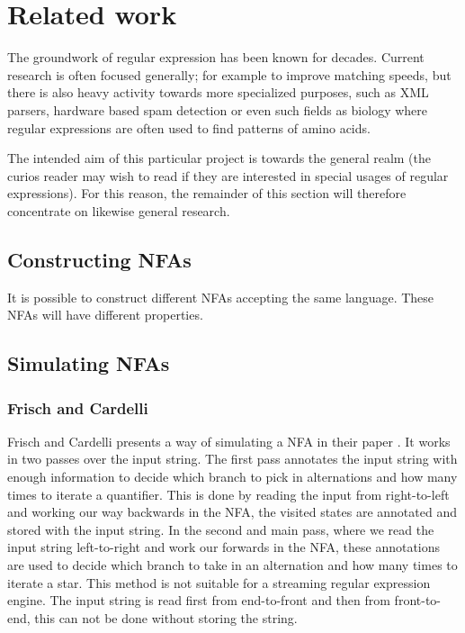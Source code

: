 \section{Related work}


The groundwork of regular expression has been known for
decades. Current research is often focused generally; for
example to improve matching speeds, but there is also heavy activity
towards more specialized purposes, such as XML parsers, hardware based spam
detection or even such fields as biology where regular expressions are
often used to find patterns of amino acids. 

The intended aim of this particular project is towards the general
realm (the curios reader may wish to read  if they
are interested in special usages of regular expressions). For this
reason, the remainder of this section will therefore concentrate on
likewise general research.



\subsection{Constructing NFAs}

It is possible to construct different NFAs accepting the same
language. These NFAs will have different properties. 


\subsection{Simulating NFAs}

\subsubsection{Frisch and Cardelli}

Frisch and Cardelli presents a way of simulating a NFA in their paper
\cite{2004:GreedyRegularExpressionMatching}. It works in two passes
over the input string. The first pass annotates the input string with
enough information to decide which branch to pick in alternations and
how many times to iterate a quantifier. This is done by reading the
input from right-to-left and working our way backwards in the NFA, the
visited states are annotated and stored with the input string. In the
second and main pass, where we read the input string left-to-right and
work our forwards in the NFA, these annotations are used to decide
which branch to take in an alternation and how many times to iterate a
star. This method is not suitable for a streaming regular expression
engine. The input string is read first from end-to-front and then from
front-to-end, this can not be done without storing the string.

